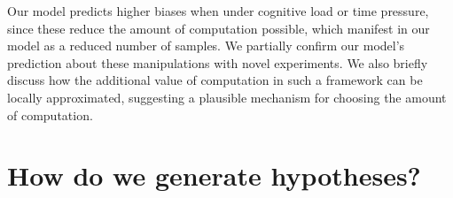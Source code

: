 Our model predicts higher biases when under cognitive load or time pressure, since these reduce the amount of computation possible, which manifest in our model as a reduced number of samples. We partially confirm our model’s prediction about these manipulations with novel experiments. We also briefly discuss how the additional value of computation in such a framework can be locally approximated, suggesting a plausible mechanism for choosing the amount of computation.

%
%



\section{How do we generate hypotheses?}

